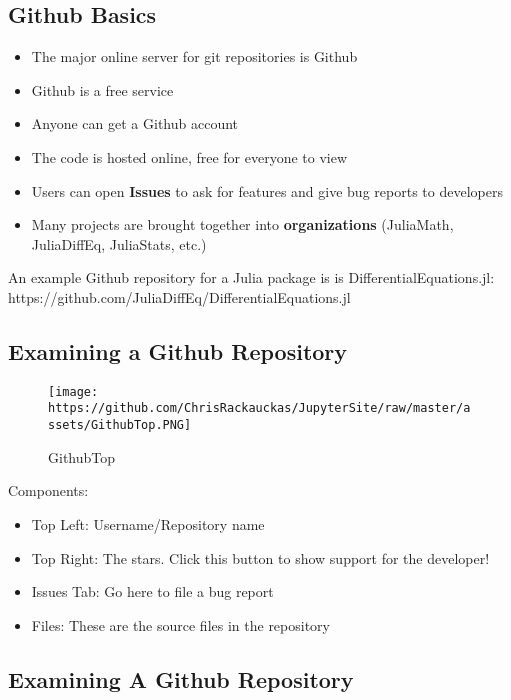 \documentclass[11pt]{article}
\makeatletter
\def\maxwidth{\ifdim\Gin@nat@width>\linewidth\linewidth
    \else\Gin@nat@width\fi}
\let\Oldincludegraphics\includegraphics
\renewcommand{\includegraphics}[1]{\Oldincludegraphics[width=.8\maxwidth]{#1}}
\makeatother
\begin{document}
    \subsection{Github Basics}\label{github-basics}

\begin{itemize}
\itemsep1pt\parskip0pt
\item
  The major online server for git repositories is Github
\item
  Github is a free service
\item
  Anyone can get a Github account
\item
  The code is hosted online, free for everyone to view
\item
  Users can open \textbf{Issues} to ask for features and give bug
  reports to developers
\item
  Many projects are brought together into \textbf{organizations}
  (JuliaMath, JuliaDiffEq, JuliaStats, etc.)
\end{itemize}

An example Github repository for a Julia package is is
DifferentialEquations.jl:
https://github.com/JuliaDiffEq/DifferentialEquations.jl

    \subsection{Examining a Github
Repository}\label{examining-a-github-repository}

\begin{figure}[htbp]
\centering
\texttt{[image: https://github.com/ChrisRackauckas/JupyterSite/raw/master/assets/GithubTop.PNG]}
\caption{GithubTop}
\end{figure}

Components:

\begin{itemize}
\itemsep1pt\parskip0pt
\item
  Top Left: Username/Repository name
\item
  Top Right: The stars. Click this button to show support for the
  developer!
\item
  Issues Tab: Go here to file a bug report
\item
  Files: These are the source files in the repository
\end{itemize}

    \subsection{Examining A Github
Repository}\label{examining-a-github-repository}
\end{document}
